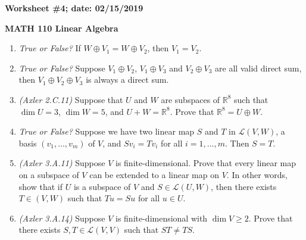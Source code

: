 \documentclass{article}
\newcommand{\RR}{\mathbb{R}}
\begin{document}
{\bf Worksheet \#4; date: 02/15/2019}

{\bf MATH 110 Linear Algebra}

\begin{enumerate}
\item {\em True or False?} If $W \oplus V_1 = W \oplus V_2$, then $V_1 = V_2$.

\item {\em True or False?} Suppose $V_1 \oplus V_2$, $V_1 \oplus V_3$ and $V_2 \oplus V_3$ are all valid direct sum, then $V_1 \oplus V_2 \oplus V_3$ is always a direct sum.

\item {\em (Axler 2.C.11)} Suppose that $U$ and $W$ are subspaces of $\RR^8$ such that $\dim U = 3$, $\dim W = 5$, and $U + W = \RR^8$. Prove that $\RR^8 = U \oplus W$.

\item {\em True or False?} Suppose we have two linear map $S$ and $T$ in $\mathcal{L}(V, W)$, a basis $(v_1, \ldots, v_m)$ of $V$, and $S v_i = T v_i$ for all $i = 1, \ldots, m$. Then $S = T$.

\item {\em (Axler 3.A.11)} Suppose $V$ is finite-dimensional. Prove that every linear map on a subspace of $V$ can be extended to a linear map on $V$. In other words, show that if $U$ is a subspace of $V$ and $S \in \mathcal{L}(U, W)$, then there exists $T \in (V, W)$ such that $Tu = Su$ for all $u \in U$.

\item {\em (Axler 3.A.14)} Suppose $V$ is finite-dimensional with $\dim V \ge 2$. Prove that there exists $S, T \in \mathcal{L}(V, V)$ such that $ST \ne TS$.
\end{enumerate}
\end{document}
